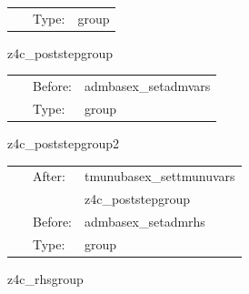 \hspace{5mm}{\it analyse z4c variables } 


\hspace{5mm}

 \begin{tabular*}{160mm}{cll} 
~ & Type:  & group \\ 
\end{tabular*} 


\vspace{5mm}


\hspace{5mm} z4c\_poststepgroup 

\hspace{5mm}{\it post-process z4c variables } 


\hspace{5mm}

 \begin{tabular*}{160mm}{cll} 
~ & Before:  & admbasex\_setadmvars \\ 
~ & Type:  & group \\ 
\end{tabular*} 


\vspace{5mm}


\hspace{5mm} z4c\_poststepgroup2 

\hspace{5mm}{\it post-process z4c variables, part 2 } 


\hspace{5mm}

 \begin{tabular*}{160mm}{cll} 
~ & After:  & tmunubasex\_settmunuvars \\ 
~& ~ &z4c\_poststepgroup\\ 
~ & Before:  & admbasex\_setadmrhs \\ 
~ & Type:  & group \\ 
\end{tabular*} 


\vspace{5mm}


\hspace{5mm} z4c\_rhsgroup 

\hspace{5mm}{\it calculate z4c rhs } 


